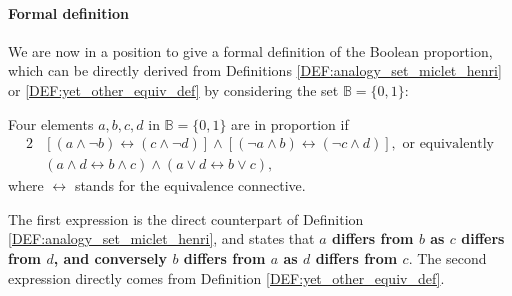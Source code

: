 \paragraph{Formal definition\\}

We are now in a position to give a formal definition of the Boolean proportion,
which can be directly derived from Definitions
\ref{DEF:analogy_set_miclet_henri} or \ref{DEF:yet_other_equiv_def} by
considering the set $\mathbb{B} = \{0, 1\}$:

\begin{definition}
  \label{DEF:boolean_proportion}
  Four elements $a, b, c, d$ in $\mathbb{B} = \{0, 1\}$ are in proportion if
  \begin{alignat*}{2}
    &\left[(a \wedge \neg b) \leftrightarrow (c \wedge \neg d)\right]  \wedge
    \left[(\neg a \wedge b)\leftrightarrow (\neg c \wedge d)\right], \text{ or equivalently}\\
     & (a \wedge d \leftrightarrow b \wedge c) \wedge (a \vee  d
    \leftrightarrow b \vee c),
  \end{alignat*}
  where $\leftrightarrow$ stands for the equivalence connective.
\end{definition}

The first expression is the direct counterpart of Definition
\ref{DEF:analogy_set_miclet_henri}, and states that \textbf{$a$ differs from
$b$ as $c$ differs from $d$, and conversely $b$ differs from $a$ as $d$ differs
from $c$}.  The second expression directly comes from Definition
\ref{DEF:yet_other_equiv_def}.

